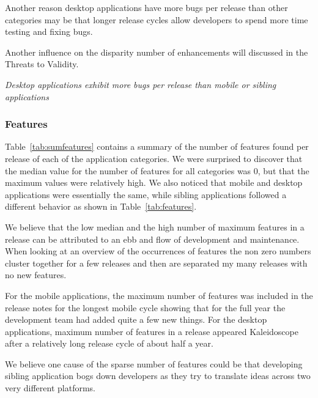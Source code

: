 \documentclass{acm_proc_article-sp}
\begin{document}
Another reason desktop applications have more bugs per release than other categories may be that longer release cycles allow developers to spend more time testing and fixing bugs. 

Another influence on the disparity number of enhancements will discussed in the Threats to Validity.

\textit{Desktop applications exhibit more bugs per release than mobile or sibling applications}

\subsubsection{Features}

\begin{center}

\label{tab:sumfeatures}
\end{center}

\begin{center}

\label{tab:features}
\end{center}

Table~\ref{tab:sumfeatures} contains a summary of the number of features found per release of each of the application categories. 
We were surprised to discover that the median value for the number of features for all categories was 0, but that the maximum values were relatively high.
We also noticed that mobile and desktop applications were essentially the same, while sibling applications followed a different behavior as shown in Table~\ref{tab:features}.

We believe that the low median and the high number of maximum features in a release can be attributed to an ebb and flow of development and maintenance. 
When looking at an overview of the occurrences of features the non zero numbers cluster together for a few releases and then are separated my many releases with no new features.

For the mobile applications, the maximum number of features was included in the release notes for the longest mobile cycle showing that for the full year the development team had added quite a few new things. 
For the desktop applications, maximum number of features in a release appeared Kaleidoscope after a relatively long release cycle of about half a year.

We believe one cause of the sparse number of features could be that developing sibling application bogs down developers as they try to translate ideas across two very different platforms. 
\end{document}
